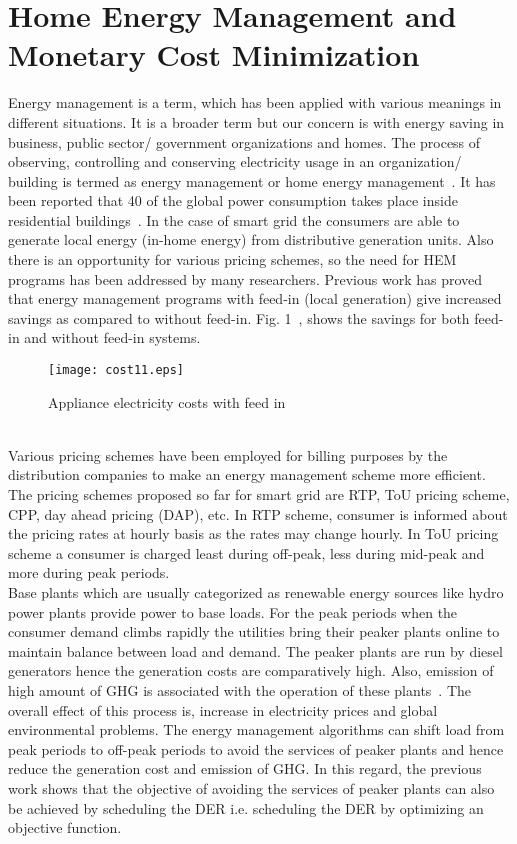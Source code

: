 \documentclass[journal]{IEEEtran}
\begin{document}
\section{Home Energy Management and Monetary Cost Minimization}
Energy management is a term, which has been applied with various meanings in different situations. It is a broader term but our concern is with energy saving in  business, public sector/ government organizations and homes. The process of observing, controlling and conserving electricity usage in an organization/ building is  termed as energy management or home energy management~\cite{kailas2012survey}. It has been reported that 40 of the global power consumption takes place inside residential buildings~\cite{Ullah2013survey}. In the case of smart grid the consumers are able to generate local energy (in-home energy) from distributive generation units. Also there is an opportunity for various pricing schemes, so the need for HEM programs has been addressed by many researchers. Previous work has proved that energy management programs with feed-in (local generation) give increased savings as compared to without feed-in. Fig. 1~\cite{erol2011wireless}, shows the savings for both feed-in and without feed-in systems.
\begin{figure}[!h]
\centering
\texttt{[image: cost11.eps]}
\caption{Appliance electricity costs with feed in }
\end{figure}\\
\indent Various pricing schemes have been employed for billing purposes by the distribution companies to make an energy management scheme more efficient. The pricing schemes proposed so far for smart grid are RTP, ToU pricing scheme, CPP, day ahead pricing (DAP), etc. In RTP scheme, consumer is informed about the pricing rates at hourly basis as the rates may change hourly. In ToU pricing scheme a consumer is charged least during off-peak, less during mid-peak and more during peak periods.\\
\indent Base plants which are usually categorized as renewable energy sources like hydro power plants provide power to base loads. For the peak periods when the consumer demand climbs rapidly the utilities bring their peaker plants online to maintain balance between load and demand. The peaker plants are run by diesel generators hence the generation costs are comparatively high. Also, emission of high amount of GHG is associated with the operation of these plants~\cite{erol2011wireless}. The overall effect of this process is, increase in electricity prices and global environmental problems. The energy management algorithms can shift load from peak periods to off-peak periods to avoid the services of peaker plants and hence reduce the generation cost and emission of GHG. In this regard, the previous work shows that the objective of avoiding the services of peaker plants can also be achieved by scheduling the DER i.e. scheduling the DER by optimizing an objective function.\\
\end{document}
